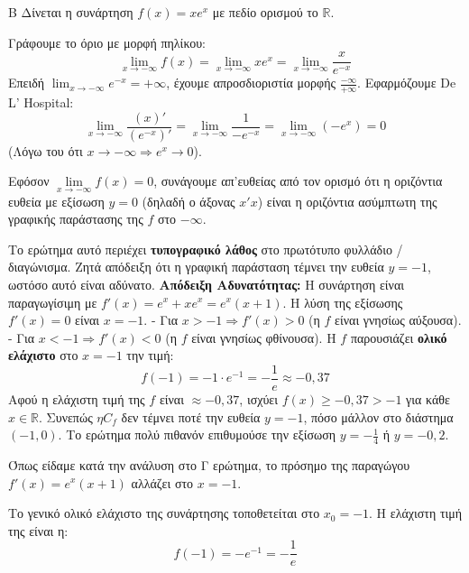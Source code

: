 \begin{thema}{Β}
Δίνεται η συνάρτηση $f(x) = x e^x$ με πεδίο ορισμού το $\mathbb{R}$.
\begin{erwthma}
\item Γράφουμε το όριο με μορφή πηλίκου:
\[ \lim_{x\to-\infty} f(x) = \lim_{x\to-\infty} x e^x = \lim_{x\to-\infty} \frac{x}{e^{-x}} \]
Επειδή $\lim_{x\to-\infty} e^{-x} = +\infty$, έχουμε απροσδιοριστία μορφής $\frac{-\infty}{+\infty}$.
Εφαρμόζουμε De L' Hospital:
\[ \lim_{x\to-\infty} \frac{(x)'}{(e^{-x})'} = \lim_{x\to-\infty} \frac{1}{-e^{-x}} = \lim_{x\to-\infty} (-e^x) = 0 \]
(Λόγω του ότι $x \to -\infty \Rightarrow e^x \to 0$).

\item Εφόσον $\lim\limits_{x\to-\infty} f(x) = 0$, συνάγουμε απ'ευθείας από τον ορισμό ότι η οριζόντια ευθεία με εξίσωση $y = 0$ (δηλαδή ο άξονας $x'x$) είναι η οριζόντια ασύμπτωτη της γραφικής παράστασης της $f$ στο $-\infty$.

\item Το ερώτημα αυτό περιέχει \textbf{τυπογραφικό λάθος} στο πρωτότυπο φυλλάδιο / διαγώνισμα. Ζητά απόδειξη ότι η γραφική παράσταση τέμνει την ευθεία $y = -1$, ωστόσο αυτό είναι αδύνατο.\newline 
\textbf{Απόδειξη Αδυνατότητας:}
Η συνάρτηση είναι παραγωγίσιμη με $f'(x) = e^x + x e^x = e^x(x+1)$.
Η λύση της εξίσωσης $f'(x)=0$ είναι $x=-1$.
- Για $x > -1 \Rightarrow f'(x) > 0$ (η $f$ είναι γνησίως αύξουσα).
- Για $x < -1 \Rightarrow f'(x) < 0$ (η $f$ είναι γνησίως φθίνουσα).
Η $f$ παρουσιάζει \textbf{ολικό ελάχιστο} στο $x = -1$ την τιμή:
\[ f(-1) = -1 \cdot e^{-1} = -\frac{1}{e} \approx -0,37 \]
Αφού η ελάχιστη τιμή της $f$ είναι $\approx -0,37$, ισχύει $f(x) \ge -0,37 > -1$ για κάθε $x \in \mathbb{R}$.
Συνεπώς $\eta C_f$ δεν τέμνει ποτέ την ευθεία $y=-1$, πόσο μάλλον στο διάστημα $(-1, 0)$. Το ερώτημα πολύ πιθανόν επιθυμούσε την εξίσωση $y = -\frac{1}{4}$ ή $y = -0,2$.

\item Όπως είδαμε κατά την ανάλυση στο Γ ερώτημα, το πρόσημο της παραγώγου $f'(x) = e^x(x+1)$ αλλάζει στο $x=-1$.
\begin{center}
\end{center}
Το γενικό ολικό ελάχιστο της συνάρτησης τοποθετείται στο $x_0 = -1$. Η ελάχιστη τιμή της είναι η:
\[ f(-1) = -e^{-1} = -\frac{1}{e} \]
\end{erwthma}
\end{thema}
